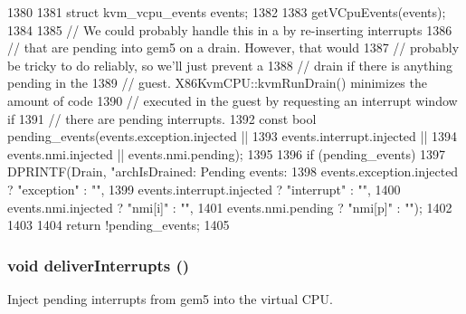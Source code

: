 \begin{DoxyCode}
1380 {
1381     struct kvm_vcpu_events events;
1382 
1383     getVCpuEvents(events);
1384 
1385     // We could probably handle this in a by re-inserting interrupts
1386     // that are pending into gem5 on a drain. However, that would
1387     // probably be tricky to do reliably, so we'll just prevent a
1388     // drain if there is anything pending in the
1389     // guest. X86KvmCPU::kvmRunDrain() minimizes the amount of code
1390     // executed in the guest by requesting an interrupt window if
1391     // there are pending interrupts.
1392     const bool pending_events(events.exception.injected ||
1393                               events.interrupt.injected ||
1394                               events.nmi.injected || events.nmi.pending);
1395 
1396     if (pending_events) {
1397         DPRINTF(Drain, "archIsDrained: Pending events: %
1398                 events.exception.injected ? "exception" : "",
1399                 events.interrupt.injected ? "interrupt" : "",
1400                 events.nmi.injected ? "nmi[i]" : "",
1401                 events.nmi.pending ? "nmi[p]" : "");
1402     }
1403 
1404     return !pending_events;
1405 }
\end{DoxyCode}
\hypertarget{classX86KvmCPU_a7f9a05aa2521efe15d995cad6a739aa5}{
\subsubsection[{deliverInterrupts}]{\setlength{\rightskip}{0pt plus 5cm}void deliverInterrupts ()}}
\label{classX86KvmCPU_a7f9a05aa2521efe15d995cad6a739aa5}
Inject pending interrupts from gem5 into the virtual CPU. 


